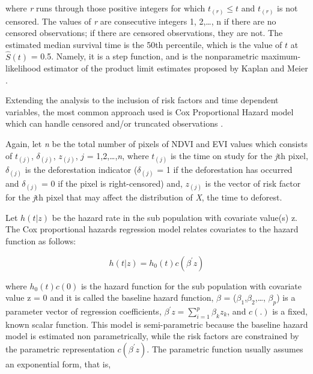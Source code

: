 where \textit{r} runs through those positive integers for which $t_{(r)} \leq t$ and $t_{(r)}$ is not censored. The values of \textit{r} are consecutive integers 1, 2,\dots , n if there are no censored observations; if there are censored observations, they are not. The estimated median survival time is the 50th percentile, which is the value of $t$ at $\hat{S}(t)$ = 0.5. Namely, it is a step function, and is the nonparametric maximum-likelihood estimator of the product limit estimates proposed by Kaplan and Meier \citep{lee_wang_2003}.


Extending the analysis to the inclusion of risk factors and time dependent variables, the most common approach used is Cox Proportional Hazard model which can handle censored and/or truncated observations \citep{Cox1972,cao_2005}. 

Again, let \textit{n} be the total number of pixels of NDVI and EVI values which consists of $t_{(j)}$, $\delta_{(j)}$, $z_{(j)}$, $\textit{j}$ = 1,2,\dots,\textit{n}, where $t_{(j)}$ is
the time on study for the \textit{j}th pixel, $\delta_{(j)}$ is the deforestation indicator ($\delta_{(j)}$ = 1 if the deforestation has occurred and $\delta_{(j)}$ = 0 if the pixel is right-censored) and, $z_{(j)}$ is the vector of risk factor for the \textit{j}th pixel that may affect the distribution of \textit{X}, the time to deforest.

Let $h(t|z)$ be the hazard rate in the sub population with covariate value(s) z. The Cox proportional hazards regression model relates covariates to the hazard function as follows:

\begin{center}
\begin{equation}
h(t|z) = h_{0}(t)c(\beta^{'}z) \label{eq:4} 
\end{equation}
\end{center}

where $h_{0}(t)c(0)$ is the hazard function for the sub population with covariate value z = 0 and it is called the baseline hazard function, $\beta$ = ($\beta_{1}$,$\beta_{2}$,\dots, $\beta_{p}$) is a parameter vector of regression coefficients, $\beta^{'}z = \sum^{p}_{i=1}\beta_{k}z_{k}$, and $c(.)$ is a fixed, known scalar function. This model is semi-parametric because the baseline hazard model is estimated non parametrically, while the risk factors are constrained by the parametric representation $c(\beta^{'}z)$. The parametric function usually assumes an exponential form, that is, 

